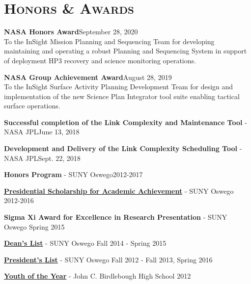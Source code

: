 \documentclass[8pt]{article}
\renewenvironment{itemize}{
  \begin{list}{}{
    \setlength{\leftmargin}{1.5em}
  }
}{
  \end{list}
}
\begin{document}
\section*{\textsc{Honors \& Awards}}

\begin{itemize}

\item \textbf{NASA Honors Award}\hfill September 28, 2020\\
To the InSight Mission Planning and Sequencing Team for developing maintaining and operating a robust Planning and Sequencing System in support of deployment HP3 recovery and science monitoring operations.

\item \textbf{NASA Group Achievement Award}\hfill August 28, 2019\\
To the InSight Surface Activity Planning Development Team for design and implementation of the new Science Plan Integrator tool suite enabling tactical surface operations.

\item \textbf{Successful completion of the Link Complexity and Maintenance Tool}
- NASA JPL\hfill June 13, 2018

\item \textbf{Development and Delivery of the Link Complexity Scheduling Tool} - NASA JPL\hfill Sept. 22, 2018

\item \textbf{Honors Program} - SUNY Oswego\hfill 2012-2017

\item \textbf{\href{http://oswegocountytoday.com/local-residents-receive-suny-oswego-scholarships/}{Presidential Scholarship for Academic Achievement}} - SUNY Oswego  \hfill 2012-2016

\item \textbf{Sigma Xi Award for Excellence in Research Presentation} - SUNY Oswego \hfill Spring 2015

\item \textbf{\href{http://meritpages.com/Kroffo}{Dean's List}} - SUNY Oswego \hfill Fall 2014 - Spring 2015

\item \textbf{\href{http://meritpages.com/Kroffo}{President's List}} - SUNY Oswego \hfill Fall 2012 - Fall 2013, Spring 2016

\item \textbf{\href{http://www.oswegocountyweeklies.com/phoenix_register.php?details&story_id=5101&story_year=2012&story_month=5}{Youth of the Year}} - John C. Birdlebough High School \hfill 2012


\end{itemize}
\end{document}
